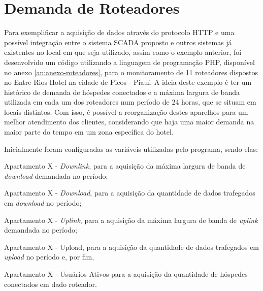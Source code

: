     	\begin{figure}[!h]
    	\end{figure}

\quad

\section{Demanda de Roteadores}
\label{sec:demanda-roteadores}
Para exemplificar a aquisição de dados através do protocolo \gls{HTTP} e uma possível integração entre o sistema \gls{SCADA} proposto e outros sistemas já existentes no local em que seja utilizado, assim como o exemplo anterior, foi desenvolvido um código utilizando a linguagem de programação PHP, disponível no anexo \ref{an:anexo-roteadores}, para o monitoramento de 11 roteadores dispostos no Entre Rios Hotel na cidade de Picos - Piauí. A ideia deste exemplo é ter um histórico de demanda de hóspedes conectados e a máxima largura de banda utilizada em cada um dos roteadores num período de 24 horas, que se situam em locais distintos. Com isso, é possível a reorganização destes aparelhos para um melhor atendimento dos clientes, considerando que haja uma maior demanda na maior parte do tempo em um zona específica do hotel.

Inicialmente foram configuradas as variáveis utilizadas pelo programa, sendo elas:

\begin{alineascomponto}
    \item Apartamento X - \textit{Downlink}, para a aquisição da máxima largura de banda de \textit{download} demandada no período;
    \item Apartamento X - \textit{Download}, para a aquisição da quantidade de dados trafegados em \textit{download} no período;
    \item Apartamento X - \textit{Uplink}, para a aquisição da máxima largura de banda de \textit{uplink} demandada no período;
    \item Apartamento X - Upload, para a aquisição da quantidade de dados trafegados em \textit{upload} no período e, por fim,
    \item Apartamento X - Usuários Ativos para a aquisição da quantidade de hóspedes conectados em dado roteador.
\end{alineascomponto}

